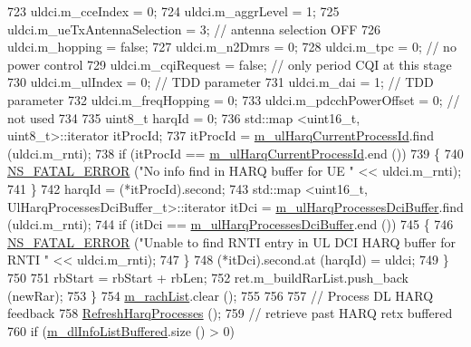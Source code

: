\begin{DoxyCode}
723           uldci.m\_cceIndex = 0;
724           uldci.m\_aggrLevel = 1;
725           uldci.m\_ueTxAntennaSelection = 3; \textcolor{comment}{// antenna selection OFF}
726           uldci.m\_hopping = \textcolor{keyword}{false};
727           uldci.m\_n2Dmrs = 0;
728           uldci.m\_tpc = 0; \textcolor{comment}{// no power control}
729           uldci.m\_cqiRequest = \textcolor{keyword}{false}; \textcolor{comment}{// only period CQI at this stage}
730           uldci.m\_ulIndex = 0; \textcolor{comment}{// TDD parameter}
731           uldci.m\_dai = 1; \textcolor{comment}{// TDD parameter}
732           uldci.m\_freqHopping = 0;
733           uldci.m\_pdcchPowerOffset = 0; \textcolor{comment}{// not used}
734 
735           uint8\_t harqId = 0;
736           std::map <uint16\_t, uint8\_t>::iterator itProcId;
737           itProcId = \hyperlink{classns3_1_1TdBetFfMacScheduler_a0776a2fc3f7186d7ec4491dc21706596}{m\_ulHarqCurrentProcessId}.find (uldci.m\_rnti);
738           \textcolor{keywordflow}{if} (itProcId == \hyperlink{classns3_1_1TdBetFfMacScheduler_a0776a2fc3f7186d7ec4491dc21706596}{m\_ulHarqCurrentProcessId}.end ())
739             \{
740               \hyperlink{group__fatal_ga5131d5e3f75d7d4cbfd706ac456fdc85}{NS\_FATAL\_ERROR} (\textcolor{stringliteral}{"No info find in HARQ buffer for UE "} << uldci.m\_rnti);
741             \}
742           harqId = (*itProcId).second;
743           std::map <uint16\_t, UlHarqProcessesDciBuffer\_t>::iterator itDci = 
      \hyperlink{classns3_1_1TdBetFfMacScheduler_a24641ddb697d45df50ee7bcaaacdb1e1}{m\_ulHarqProcessesDciBuffer}.find (uldci.m\_rnti);
744           \textcolor{keywordflow}{if} (itDci == \hyperlink{classns3_1_1TdBetFfMacScheduler_a24641ddb697d45df50ee7bcaaacdb1e1}{m\_ulHarqProcessesDciBuffer}.end ())
745             \{
746               \hyperlink{group__fatal_ga5131d5e3f75d7d4cbfd706ac456fdc85}{NS\_FATAL\_ERROR} (\textcolor{stringliteral}{"Unable to find RNTI entry in UL DCI HARQ buffer for RNTI "} << 
      uldci.m\_rnti);
747             \}
748           (*itDci).second.at (harqId) = uldci;
749         \}
750 
751       rbStart = rbStart + rbLen;
752       ret.m\_buildRarList.push\_back (newRar);
753     \}
754   \hyperlink{classns3_1_1TdBetFfMacScheduler_ac88efaa3ffc00af6dd71b21d2bef0448}{m\_rachList}.clear ();
755 
756 
757   \textcolor{comment}{// Process DL HARQ feedback}
758   \hyperlink{classns3_1_1TdBetFfMacScheduler_aafa15782e9b220093765a83939821534}{RefreshHarqProcesses} ();
759   \textcolor{comment}{// retrieve past HARQ retx buffered}
760   \textcolor{keywordflow}{if} (\hyperlink{classns3_1_1TdBetFfMacScheduler_ad28a9447cadd7f80c4fe5d3801d8828b}{m\_dlInfoListBuffered}.size () > 0)

\end{DoxyCode}
